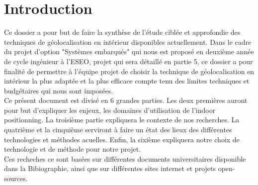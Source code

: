 \section{Introduction}

Ce dossier a pour but de faire la synthèse de l'étude ciblée et approfondie des techniques de géolocalisation en intérieur disponibles actuellement. 
Dans le cadre du projet d'option "Systèmes embarqués" qui nous est proposé en deuxième année de cycle ingénieur à l'ESEO, projet qui sera détaillé en partie 5, ce dossier a pour finalité de permettre à l'équipe projet de choisir la technique de géolocalisation en intérieur la plus adaptée et la plus efficace compte tenu des limites techniques et budgétaires qui nous sont imposées.
\medskip
\\
Ce présent document est divisé en 6 grandes parties. 
Les deux premières auront pour but d'expliquer les enjeux, les domaines d'utilisation de l'indoor positionning.
La troisième partie expliquera le contexte de nos recherches. 
La quatrième et la cinquième serviront à faire un état des lieux des différentes technologies et méthodes acuelles.
Enfin, la sixième expliquera notre choix de technologie et de méthode pour notre projet.
\medskip
\\
Ces recheches ce sont basées sur différentes documents universitaires disponible dans la Bibiographie, ainsi que sur différentes sites internet et projets open-sources.
